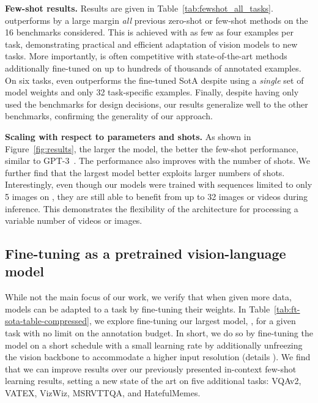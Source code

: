 \textbf{Few-shot results.}
Results are given in Table~\ref{tab:fewshot_all_tasks}.
\largem{} outperforms by a large margin \emph{all} previous zero-shot or few-shot methods on the 16 benchmarks considered.
This is achieved with as few as four examples per task, demonstrating practical and efficient adaptation of vision models to new tasks.
More importantly, \largem{} is often competitive with state-of-the-art methods additionally fine-tuned on up to hundreds of thousands of annotated examples.
On six tasks, \largem{} even outperforms the fine-tuned SotA despite using a \emph{single} set of model weights and only 32 task-specific examples.
Finally, despite having only used the \dev{} benchmarks for design decisions, our results generalize well to the other benchmarks, confirming the generality of our approach.

\textbf{Scaling with respect to parameters and shots.}
As shown in Figure~\ref{fig:results}, the larger the model, the better the few-shot performance, similar to GPT-3~\citep{gpt3}.
The performance also improves with the number of shots.
We further find that the largest model better exploits larger numbers of shots.
Interestingly, even though our \method{} models were trained with sequences limited to only 5 images on \mmmw{}, they are still able to benefit from up to 32 images or videos during inference.
This demonstrates the flexibility of the \method{} architecture for processing a variable number of videos or images.


\subsection{Fine-tuning \largem{} as a pretrained vision-language model}
\label{sec:ft_results}

While not the main focus of our work, we verify that when given more data, \method{} models can be adapted to a task by fine-tuning their weights.
In Table~\ref{tab:ft-sota-table-compressed}, we explore fine-tuning our largest model, \largem{}, for a given task with no limit on the annotation budget.
In short, we do so by fine-tuning the model on a short schedule with a small learning rate by additionally unfreezing the vision backbone to accommodate a higher input resolution (details ).
We find that we can improve results over our previously presented in-context few-shot learning results, setting a new state of the art on five additional tasks: VQAv2, VATEX, VizWiz, MSRVTTQA, and HatefulMemes.

